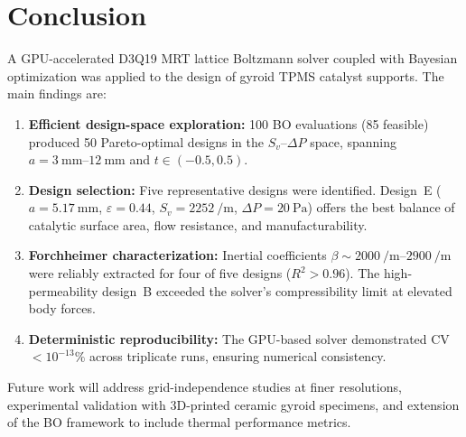 \section{Conclusion}\label{sec:conclusion}

A GPU-accelerated D3Q19 MRT lattice Boltzmann solver coupled with
Bayesian optimization was applied to the design of gyroid TPMS
catalyst supports.  The main findings are:

\begin{enumerate}
  \item \textbf{Efficient design-space exploration:}
    100 BO evaluations (85 feasible) produced 50 Pareto-optimal
    designs in the $S_v$--$\Delta P$ space, spanning
    $a = \SIrange{3}{12}{\milli\meter}$ and $t \in (-0.5, 0.5)$.

  \item \textbf{Design selection:}
    Five representative designs were identified.
    Design~E ($a = \SI{5.17}{\milli\meter}$, $\varepsilon = 0.44$,
    $S_v = \SI{2252}{\per\meter}$, $\Delta P = \SI{20}{\pascal}$)
    offers the best balance of catalytic surface area, flow resistance,
    and manufacturability.

  \item \textbf{Forchheimer characterization:}
    Inertial coefficients $\beta \sim \SIrange{2000}{2900}{\per\meter}$
    were reliably extracted for four of five designs ($R^2 > 0.96$).
    The high-permeability design~B exceeded the solver's
    compressibility limit at elevated body forces.

  \item \textbf{Deterministic reproducibility:}
    The GPU-based solver demonstrated CV $< 10^{-13}\%$
    across triplicate runs, ensuring numerical consistency.
\end{enumerate}

Future work will address grid-independence studies at finer resolutions,
experimental validation with 3D-printed ceramic gyroid specimens,
and extension of the BO framework to include thermal performance metrics.

